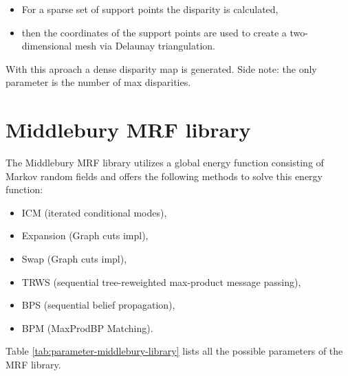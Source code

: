 \begin{itemize}
  \item For a sparse set of support points the disparity is calculated,
  \item then the coordinates of the support points are used to create a two-dimensional mesh via Delaunay triangulation.
\end{itemize}

\noindent With this aproach a dense disparity map is generated. Side note: the only parameter is the number of max disparities.

\section{Middlebury MRF library}

The Middlebury MRF library\citep{scharstein2014high, szeliski2008comparative} utilizes a global energy function consisting of Markov random fields and offers the following methods to solve this energy function:

\begin{itemize}
  \item ICM (iterated conditional modes),
  \item Expansion (Graph cuts impl),
  \item Swap (Graph cuts impl),
  \item TRWS (sequential tree-reweighted max-product message passing),
  \item BPS (sequential belief propagation),
  \item BPM (MaxProdBP Matching).
\end{itemize}

\noindent Table \ref{tab:parameter-middlebury-library} lists all the possible parameters of the MRF library.

